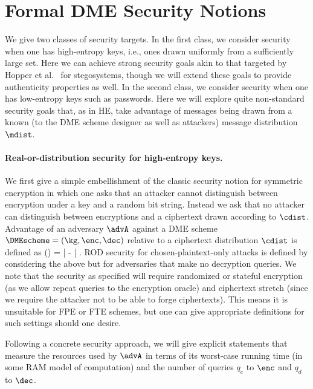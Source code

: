 \section{Formal DME Security Notions} 

We give two classes of security targets. In the first class, we consider
security when one has high-entropy keys, i.e., ones drawn uniformly from a
sufficiently large set. Here we can achieve strong security goals akin to that
targeted by Hopper et al.~\cite{hopper} for stegosystems, though we will extend
these goals to provide authenticity properties as well. In the second class, we
consider security when one has low-entropy keys such as passwords. Here we will
explore quite non-standard security goals that, as in HE, take advantage of 
messages being drawn from a known (to the DME scheme designer as well as
attackers) message distribution $\mdist$. 


\paragraph{Real-or-distribution security for high-entropy keys.} We first give a
simple embellishment of the classic security notion for symmetric encryption in
which one asks that an attacker cannot distinguish between encryption under a
key and a random bit string. Instead we ask that no attacker can distinguish
between encryptions and a ciphertext drawn according to $\cdist$. Advantage of
an adversary $\advA$ against a DME scheme $\DMEscheme = (\kg,\enc,\dec)$
relative to a ciphertext distribution $\cdist$ is defined as
\bnm
  \AdvROD{\DMEscheme,\cdist}(\advA) = 
          \left|
              - \right| \;.
\enm
ROD security for chosen-plaintext-only attacks
is defined by considering the above but for adversaries that make no decryption
queries. We note that the security as specified will require randomized or
stateful encryption (as we allow repeat queries to the encryption oracle) and
ciphertext stretch (since we require the attacker not to be able to forge
ciphertexts). This means it is unsuitable for FPE or FTE schemes, but one can
give appropriate definitions for such settings should one desire. 


Following a concrete security approach, we will give explicit statements
that measure the resources used by $\advA$ in terms of its worst-case running
time (in some RAM model of computation) and the number of queries $q_e$ to
$\enc$ and $q_d$ to $\dec$. 

